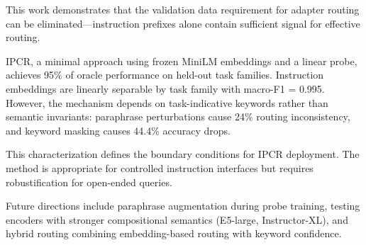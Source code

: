 
This work demonstrates that the validation data requirement for adapter routing can be eliminated---instruction prefixes alone contain sufficient signal for effective routing.

IPCR, a minimal approach using frozen MiniLM embeddings and a linear probe, achieves 95\% of oracle performance on held-out task families. Instruction embeddings are linearly separable by task family with macro-F1 = 0.995. However, the mechanism depends on task-indicative keywords rather than semantic invariants: paraphrase perturbations cause 24\% routing inconsistency, and keyword masking causes 44.4\% accuracy drops.

This characterization defines the boundary conditions for IPCR deployment. The method is appropriate for controlled instruction interfaces but requires robustification for open-ended queries.

Future directions include paraphrase augmentation during probe training, testing encoders with stronger compositional semantics (E5-large, Instructor-XL), and hybrid routing combining embedding-based routing with keyword confidence.

